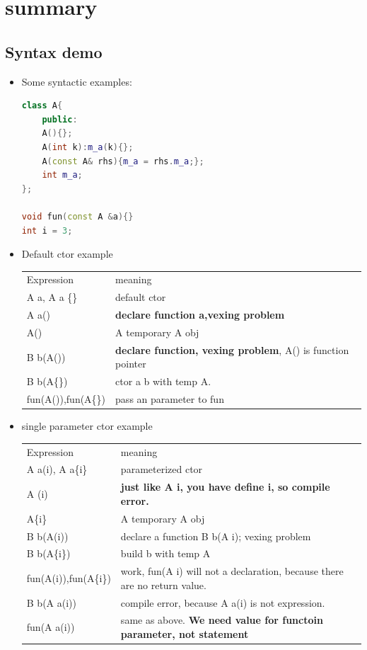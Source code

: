 \documentclass[a4paper,11pt,twoside]{book}
\renewcommand{\hline}{}
\begin{document}
\section{summary}

\subsection{Syntax demo}
\begin{itemize}
	
	\item Some syntactic examples: \newline
\begin{lstlisting}[frame=single, language=c++]
class A{
	public:
	A(){};
	A(int k):m_a(k){};
	A(const A& rhs){m_a = rhs.m_a;};
	int m_a;
};
	
void fun(const A &a){}
int i = 3;
\end{lstlisting}
	
	\item Default ctor example \newline
	\begin{tabular}{|p{}|p{}|}
		\hline
		Expression & meaning \\
		\hline
		A a, A a \{\} & default ctor \\
		\hline
		A a() & \textbf{declare function a,vexing problem} \\
		\hline
		A() & A temporary A obj\\
		\hline
		B b(A()) & \textbf{declare function, vexing problem}, A() is function pointer \\
		\hline
		B b(A\{\}) & ctor a b with temp A. \\
		\hline
		fun(A()),fun(A\{\}) & pass an parameter to fun\\
		\hline
	\end{tabular}
	\item single parameter ctor example \newline
	
	\begin{tabular}{|p{}|p{}|}
		\hline
		Expression & meaning \\
		\hline
		A a(i), A a\{i\} & parameterized ctor\\
		\hline
		A (i) & \textbf{just like A i, you have define i, so compile error.} \\
		\hline
		A\{i\} & A temporary A obj\\
		\hline
		B b(A(i)) & declare a function B b(A i); vexing problem \\
		\hline
		B b(A\{i\}) & build b with temp A\\
		\hline
		fun(A(i)),fun(A\{i\}) & work, fun(A i) will not a declaration, because there are no return value.\\
		\hline
		B b(A a(i))  & compile error, because A a(i) is not expression. \\
		\hline
		fun(A a(i)) & same as above. \textbf{We need value for functoin parameter, not statement} \\
		\hline
	\end{tabular}
	

\end{itemize}
\end{document}
